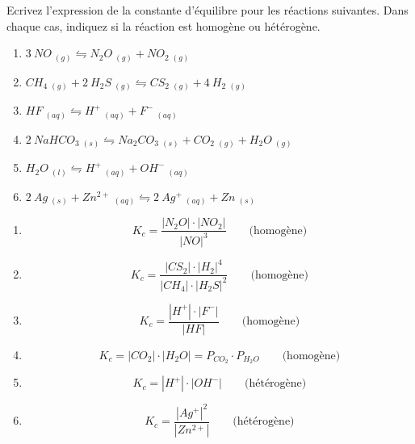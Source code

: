 \documentclass[
  11pt,
  a4paper,
  openany]{book}
\providecommand{\tightlist}{%
  \setlength{\itemsep}{0pt}\setlength{\parskip}{0pt}}
\begin{document}
\begin{Exercise}

Ecrivez l'expression de la constante d'équilibre pour les réactions suivantes. Dans chaque cas, indiquez si la réaction est homogène ou hétérogène.

\begin{enumerate}
\def\labelenumi{\arabic{enumi}.}
\tightlist
\item
  \(3\ NO\ _{(g)} \leftrightharpoons N_2O\ _{(g)} +  NO_2\ _{(g)}\)
\item
  \(CH_4\ _{(g)} + 2\ H_2S\ _{(g)} \leftrightharpoons CS_2\ _{(g)} +  4\ H_2\ _{(g)}\)
\item
  \(HF\ _{(aq)} \leftrightharpoons H^+\ _{(aq)} +  F^-\ _{(aq)}\)
\item
  \(2\ NaHCO_3\ _{(s)} \leftrightharpoons Na_2CO_3\ _{(s)} + CO_2\ _{(g)} + H_2O\ _{(g)}\)
\item
  \(H_2O\ _{(l)} \leftrightharpoons H^+\ _{(aq)} +  OH^-\ _{(aq)}\)
\item
  \(2\ Ag\ _{(s)} + Zn^{2+}\ _{(aq)} \leftrightharpoons 2\ Ag^+\ _{(aq)} +  Zn\ _{(s)}\)
\end{enumerate}

\end{Exercise}

\begin{Answer}

\begin{enumerate}
\def\labelenumi{\arabic{enumi}.}
\tightlist
\item
  \[ K_{c} = \frac{|N_2O| \cdot |NO_2|}{|NO|^{3}} \qquad \text{(homogène)} \]
\item
  \[ K_{c} = \frac{|CS_2| \cdot |H_2|^{4}}{|CH_4| \cdot |H_2S|^{2}} \qquad \text{(homogène)} \]
\item
  \[ K_{c} = \frac{|H^+| \cdot |F^-|}{|HF|} \qquad \text{(homogène)} \]
\item
  \[ K_{c} = |CO_2| \cdot |H_2O| = P_{CO_2} \cdot P_{H_2O} \qquad \text{(homogène)} \]
\item
  \[ K_{c} = |H^+| \cdot |OH^-| \qquad \text{(hétérogène)} \]
\item
  \[ K_{c} = \frac{|Ag^+|^{2}}{|Zn^{2+}|} \qquad \text{(hétérogène)} \]
\end{enumerate}

\clearpage

\end{Answer}
\end{document}
